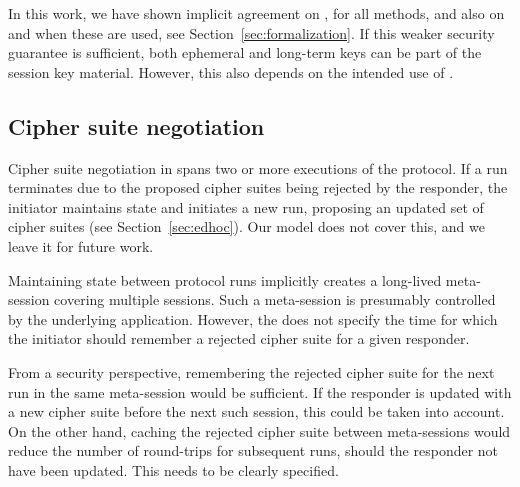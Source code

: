\documentclass[runningheads, envcountsame, a4paper, draft, x11names]{llncs}
\newcommand{\spacehack}{\vspace{-1em}}
\newcommand{\fillhack}{\vspace{-0.5em}}
\begin{document}
In this work, we have shown implicit agreement on \mGx{}, \mGy{} for all
methods, and also on \mGiy{} and \mGrx{} when these are used,
see Section~\ref{sec:formalization}.
%
If this weaker security guarantee is sufficient, both ephemeral and long-term
keys can be part of the session key material.
%
However, this also depends on the intended use of \mEdhoc{}.
%

\spacehack
\subsection{Cipher suite negotiation}
\label{sec:ciphersuiteNegotiation}
\fillhack
{}
%
Cipher suite negotiation in \mEdhoc{} spans two or more executions of the
protocol.
%
If a run terminates due to the proposed cipher suites being rejected by the
responder, the initiator maintains state and initiates a new run, proposing
an updated set of cipher suites (see Section~\ref{sec:edhoc}).
%
Our model does not cover this, and we leave it for future work.

Maintaining state between protocol runs implicitly creates a long-lived
meta-session covering multiple \mEdhoc{} sessions.
%
Such a meta-session is presumably controlled by the underlying application.
%
However, the \mSpec{} does not specify the time for which the initiator should
remember a rejected cipher suite for a given responder.
%

From a security perspective, remembering the rejected cipher suite for the
next \mEdhoc{} run in the same meta-session would be sufficient.
%
If the responder is updated with a new cipher suite before the next such
session, this could be taken into account. On the other hand, caching the
rejected cipher suite between meta-sessions would reduce the number of
round-trips for subsequent runs, should the responder not have been updated.
%
This needs to be clearly specified. 

\spacehack
\end{document}
